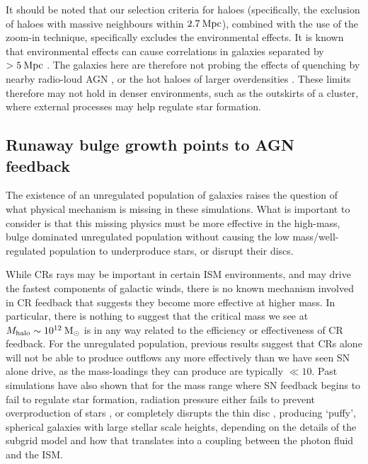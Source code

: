 It should be noted that our selection criteria for haloes (specifically, the
exclusion of haloes with massive neighbours within $2.7\>{\rm Mpc}$), combined with the
use of the zoom-in technique, specifically excludes the environmental effects.
It is known that environmental effects can cause correlations in galaxies
separated by $>5\>{\rm Mpc}$ \citep{Weinmann2006}.  The galaxies here are therefore not
probing the effects of quenching by nearby radio-loud AGN \citep{Kauffmann2015},
or the hot haloes of larger overdensities \citep{Kauffmann2013}.   These limits
therefore may not hold in denser environments, such as the outskirts of a
cluster, where external processes may help regulate star formation.

\subsection{Runaway bulge growth points to AGN feedback}

           
The existence of an unregulated population of galaxies raises the
question of what physical mechanism is missing in these simulations.  What is
important to consider is that this missing physics must be more effective in the
high-mass, bulge dominated unregulated population without causing the low
mass/well-regulated population to underproduce stars, or disrupt their discs.

While CRs rays may be important in certain ISM environments, and may drive
the fastest components of galactic winds, there is no known mechanism involved
in CR feedback that suggests they become more effective at higher mass.  In
particular, there is nothing to suggest that the critical mass we see at
$M_{\rm halo}\sim10^{12}\>{\rm M_{\odot}}$ is in any way related to the efficiency or
effectiveness of CR feedback.  For the unregulated population, previous results
suggest that CRs alone will not be able to produce outflows any more
effectively than we have seen SN alone drive, as the mass-loadings they can
produce are typically $\ll10$.  Past simulations have also shown that for the
mass range where SN feedback begins to fail to regulate star formation,
radiation pressure either fails to prevent overproduction of stars
\citep{Aumer2013}, or completely disrupts the thin disc \citep{Roskar2014},
producing `puffy', spherical galaxies with large stellar scale heights,
depending on the details of the subgrid model and how that translates into a
coupling between the photon fluid and the ISM.

